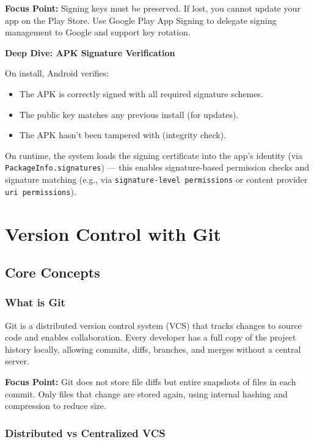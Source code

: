 \documentclass[a4paper,12pt]{article}
\begin{document}
\textbf{Focus Point:} Signing keys must be preserved. If lost, you cannot update your app on the Play Store. Use Google Play App Signing to delegate signing management to Google and support key rotation.

\textbf{Deep Dive: APK Signature Verification}

On install, Android verifies:
\begin{itemize}
  \item The APK is correctly signed with all required signature schemes.
  \item The public key matches any previous install (for updates).
  \item The APK hasn't been tampered with (integrity check).
\end{itemize}

On runtime, the system loads the signing certificate into the app’s identity (via \texttt{PackageInfo.signatures}) — this enables signature-based permission checks and signature matching (e.g., via \texttt{signature-level permissions} or content provider \texttt{uri permissions}).


\section{Version Control with Git}
\label{sec:git}

\subsection{Core Concepts}

\subsubsection{What is Git}

Git is a distributed version control system (VCS) that tracks changes to source code and enables collaboration. Every developer has a full copy of the project history locally, allowing commits, diffs, branches, and merges without a central server.

\textbf{Focus Point:} Git does not store file diffs but entire snapshots of files in each commit. Only files that change are stored again, using internal hashing and compression to reduce size.

\subsubsection{Distributed vs Centralized VCS}
\end{document}
